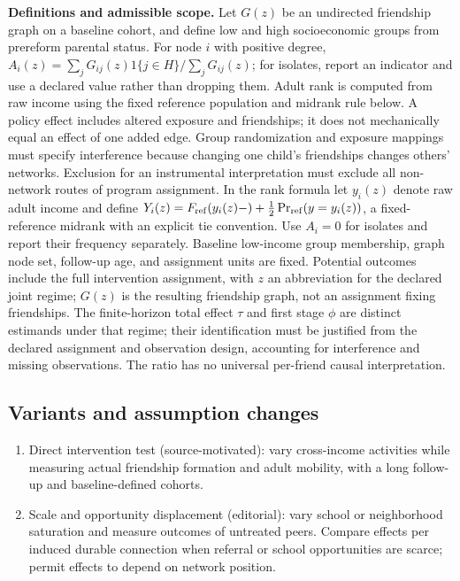 \documentclass[11pt,a4paper]{article}
\begin{document}
\textbf{Definitions and admissible scope.} Let \(G(z)\) be an undirected friendship graph on a baseline cohort, and define low and high socioeconomic groups from prereform parental status. For node \(i\) with positive degree, \(A_i(z)=\sum_jG_{ij}(z)1\{j\in H\}/\sum_jG_{ij}(z)\); for isolates, report an indicator and use a declared value rather than dropping them. Adult rank is computed from raw income using the fixed reference population and midrank rule below. A policy effect includes altered exposure and friendships; it does not mechanically equal an effect of one added edge. Group randomization and exposure mappings must specify interference because changing one child's friendships changes others' networks. Exclusion for an instrumental interpretation must exclude all non-network routes of program assignment. In the rank formula let \(y_i(z)\) denote raw adult income and define \(Y_i(z)=F_{\rm ref}(y_i(z)-)+\tfrac12\Pr_{\rm ref}(y=y_i(z))\), a fixed-reference midrank with an explicit tie convention. Use \(A_i=0\) for isolates and report their frequency separately. Baseline low-income group membership, graph node set, follow-up age, and assignment units are fixed. Potential outcomes include the full intervention assignment, with \(z\) an abbreviation for the declared joint regime; \(G(z)\) is the resulting friendship graph, not an assignment fixing friendships. The finite-horizon total effect \(\tau\) and first stage \(\phi\) are distinct estimands under that regime; their identification must be justified from the declared assignment and observation design, accounting for interference and missing observations. The ratio has no universal per-friend causal interpretation.
\subsection*{Variants and assumption changes}
\begin{enumerate}
\item Direct intervention test (source-motivated): vary cross-income activities while measuring actual friendship formation and adult mobility, with a long follow-up and baseline-defined cohorts.
\item Scale and opportunity displacement (editorial): vary school or neighborhood saturation and measure outcomes of untreated peers. Compare effects per induced durable connection when referral or school opportunities are scarce; permit effects to depend on network position.
\end{enumerate}
\end{document}
